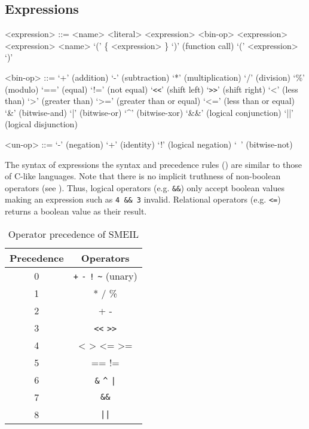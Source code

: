 
\subsection{Expressions}
\begin{grammar}
  <expression> ::= <name>
  \alt <literal>
  \alt <expression> <bin-op> <expression>
   <expression>
  \alt <name> `(' \{ <expression> \}  `)' (function call)
  \alt `(' <expression> `)'

  <bin-op> ::= `+' (addition)
  \alt `-' (subtraction)
  \alt `*' (multiplication)
  \alt `/' (division)
  \alt `\%' (modulo)
  \alt `==' (equal)
  \alt `!=' (not equal)
  \alt `\verb!<<!' (shift left)
  \alt `\verb!>>!' (shift right)
  \alt `<' (less than)
  \alt `>' (greater than)
  \alt `>=' (greater than or equal)
  \alt `<=' (less than or equal)
  \alt `\&' (bitwise-and)
  \alt `|' (bitwise-or)
  \alt `^' (bitwise-xor)
  \alt `\&\&' (logical conjunction)
  \alt `||' (logical disjunction)

  <un-op> ::= `-' (negation)
  \alt `+' (identity)
  \alt `!' (logical negation)
  \alt `~' (bitwise-not)

\end{grammar}

The syntax of expressions the syntax and precedence rules () are
similar to those of C-like languages. Note that there is no implicit truthness
of non-boolean operators (see ). Thus, logical operators
(e.g. \texttt{\&\&}) only accept boolean values making an expression such as
\texttt{4 \&\& 3} invalid. Relational operators (e.g. \texttt{<=}) returns a
boolean value as their result.


\begin{table}%
  \centering
\begin{tabular}{cc}
  \toprule
  \textbf{Precedence} & \textbf{Operators}\\
  \midrule
  0 & \verb!+! \verb!-! \verb|!| \verb!~! (unary)\\
  1 & * / \% \\
  2 & + - \\
  3 & \verb!<<! \verb!>>! \\
  4 & < > <= >= \\
  5 & == != \\
  6 & \verb!&! \verb!^! \verb!|! \\
  7 & \verb!&&! \\
  8 & \verb!||! \\
  \bottomrule
\end{tabular}
\caption{Operator precedence of SMEIL}
\label{tab:ops}
\end{table}

